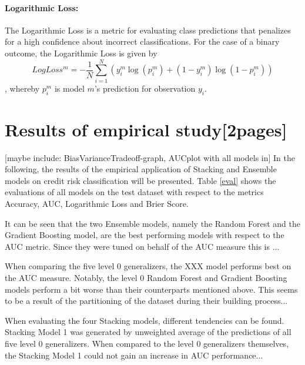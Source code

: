 \documentclass[12pt]{article}
\begin{document}
\paragraph{Logarithmic Loss:} The Logarithmic Loss is a metric for evaluating class predictions that penalizes for a high confidence about incorrect classifications. For the case of a binary outcome, the Logarithmic Loss is given by\\
\begin{equation}
LogLoss^m = - \frac{1}{N}\sum_{i=1}^{N}(y^m_i\log(p^m_i) + (1 - y^m_i)\log(1 - p^m_i))
\end{equation}
, whereby $p^m_i$ is model $m$'s prediction for observation $y_i$.

\section{Results of empirical study[2pages]}\label{results}
[maybe include: BiasVarianceTradeoff-graph, AUCplot with all models in]
In the following, the results of the empirical application of Stacking and Ensemble models on credit risk classification will be presented. Table \ref{eval} shows the evaluations of all models on the test dataset with respect to the metrics Accuracy, AUC, Logarithmic Loss and Brier Score. 

It can be seen that the two Ensemble models, namely the Random Forest and the Gradient Boosting model, are the best performing models with respect to the AUC metric. Since they were tuned on behalf of the AUC measure this is ...

When comparing the five level 0 generalizers, the XXX model performs best on the AUC measure. Notably, the level 0 Random Forest and Gradient Boosting models perform a bit worse than their counterparts mentioned above. This seems to be a result of the partitioning of the dataset during their building process...

When evaluating the four Stacking models, different tendencies can be found. Stacking Model 1 was generated by unweighted average of the predictions of all five level 0 generalizers. When compared to the level 0 generalizers themselves, the Stacking Model 1 could not gain an increase in AUC performance...
\end{document}
